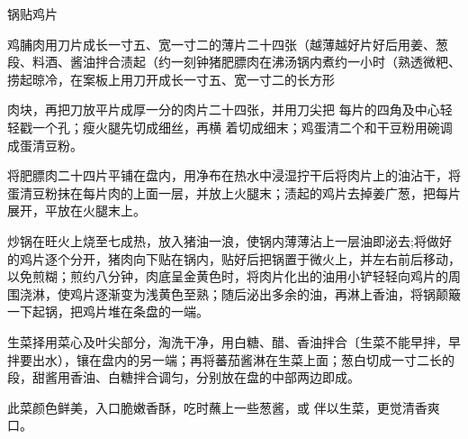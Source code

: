 \begin{recipe}{锅贴鸡片}

\ingredients


\cooking

\step 鸡脯肉用刀片成长一寸五、宽一寸二的薄片二十四张（越薄越好片好后用姜、葱段、料酒、酱油拌合渍起（约一刻钟猪肥膘肉在沸汤锅内煮约一小时（熟透微粑、捞起晾冷，在案板上用刀开成长一寸五、宽一寸二的长方形

肉块，再把刀放平片成厚一分的肉片二十四张，并用刀尖把 每片的四角及中心轻轻戳一个孔；瘦火腿先切成细丝，再横 着切成细末；鸡蛋清二个和干豆粉用碗调成蛋清豆粉。

\step 将肥膘肉二十四片平铺在盘内，用净布在热水中浸湿拧干后将肉片上的油沾干，将蛋清豆粉抹在每片肉的上面一层，并放上火腿末；渍起的鸡片去掉姜广葱，把每片展开，平放在火腿末上。

\step 炒锅在旺火上烧至七成热，放入猪油一浪，使锅内薄薄沾上一层油即泌去;将做好的鸡片逐个分开，猪肉向下贴在锅内，贴好后把锅置于微火上，并左右前后移动，以免煎糊；煎约八分钟，肉底呈金黄色时，将肉片化出的油用小铲轻轻向鸡片的周围浇淋，使鸡片逐渐变为浅黄色至熟；随后泌出多余的油，再淋上香油，将锅颠簸一下起锅，把鸡片堆在条盘的一端。

\step 生菜择用菜心及叶尖部分，淘洗干净，用白糖、醋、香油拌合〔生菜不能早拌，早拌要出水），镶在盘内的另一端；再将蕃茄酱淋在生菜上面；葱白切成一寸二长的段，甜酱用香油、白糖拌合调匀，分别放在盘的中部两边即成。

\notes

此菜颜色鲜美，入口脆嫩香酥，吃时蘸上一些葱酱，或 伴以生菜，更觉清香爽口。

\end{recipe}

